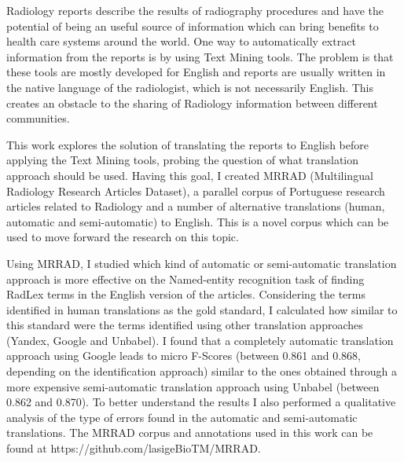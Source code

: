 \begin{abstracts}

Radiology reports describe the results of radiography procedures and have the potential of being an useful source of information which can bring benefits to health care systems around the world. One way to automatically extract information from the reports is by using Text Mining tools. The problem is that these tools are mostly developed for English and reports are usually written in the native language of the radiologist, which is not necessarily English. This creates an obstacle to the sharing of Radiology information between different communities.

This work explores the solution of translating the reports to English before applying the Text Mining tools, probing the question of what translation approach should be used. Having this goal, I created MRRAD (Multilingual Radiology Research Articles Dataset), a parallel corpus of Portuguese research articles related to Radiology and a number of alternative translations (human, automatic and semi-automatic) to English. This is a novel corpus which can be used to move forward the research on this topic.

Using MRRAD, I studied which kind of automatic or semi-automatic translation approach is more effective on the Named-entity recognition task of finding RadLex terms in the English version of the articles. Considering the terms identified in human translations as the gold standard, I calculated how similar to this standard were the terms identified using other translation approaches (Yandex, Google and Unbabel). I found that a completely automatic translation approach using Google leads to micro F-Scores (between 0.861 and 0.868, depending on the identification approach) similar to the ones obtained through a more expensive semi-automatic translation approach using Unbabel (between 0.862 and 0.870). To better understand the results I also performed a qualitative analysis of the type of errors found in the automatic and semi-automatic translations. The MRRAD corpus and annotations used in this work can be found at https://github.com/lasigeBioTM/MRRAD.

\end{abstracts}
